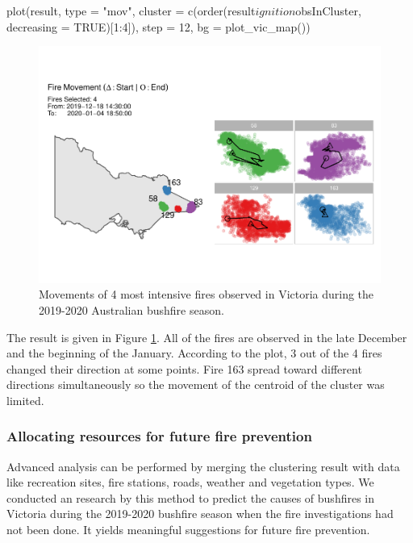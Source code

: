 \begin{Schunk}
\begin{Sinput}
plot(result, 
     type = "mov", 
     cluster = c(order(result$ignition$obsInCluster, 
                       decreasing = TRUE)[1:4]), 
     step = 12, 
     bg = plot_vic_map())
\end{Sinput}
\begin{figure}

{\centering \includegraphics[width=0.8\linewidth]{clustering_paper_files/figure-latex/firemovem-1} 

}

\caption[Movements of 4 most intensive fires observed in Victoria during the 2019-2020 Australian bushfire season]{Movements of 4 most intensive fires observed in Victoria during the 2019-2020 Australian bushfire season.}\label{fig:firemovem}
\end{figure}
\end{Schunk}

The result is given in Figure \ref{fig:firemovem}. All of the fires are
observed in the late December and the beginning of the January.
According to the plot, 3 out of the 4 fires changed their direction at
some points. Fire 163 spread toward different directions simultaneously
so the movement of the centroid of the cluster was limited.

\hypertarget{allocating-resources-for-future-fire-prevention}{%
\subsubsection{Allocating resources for future fire
prevention}\label{allocating-resources-for-future-fire-prevention}}

Advanced analysis can be performed by merging the clustering result with
data like recreation sites, fire stations, roads, weather and vegetation
types. We conducted an research \citep{conart} by this method to predict
the causes of bushfires in Victoria during the 2019-2020 bushfire season
when the fire investigations had not been done. It yields meaningful
suggestions for future fire prevention.

